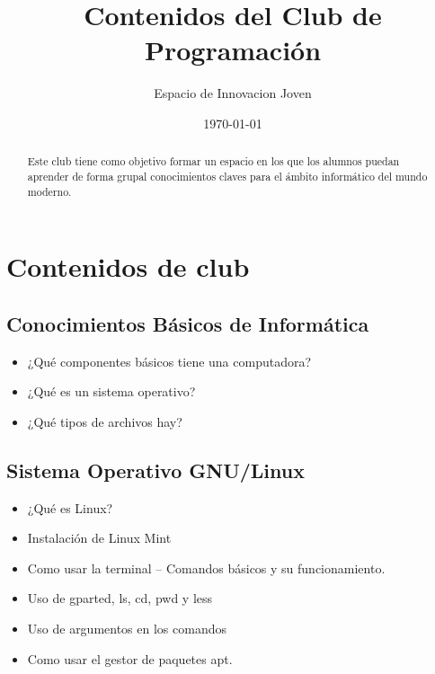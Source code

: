 \documentclass{article}
\title{Contenidos del Club de Programación}
\date{\today}
\author{Espacio de Innovacion Joven}
\begin{document}
\maketitle
\thispagestyle{fancy}

\begin{abstract}
	Este club tiene como objetivo formar un espacio en los que los alumnos
	puedan aprender de forma grupal conocimientos claves para el ámbito informático
	del mundo moderno.
\end{abstract}

\section{Contenidos de club}

\subsection{Conocimientos Básicos de Informática}
\begin{itemize}
	\item ¿Qué componentes básicos tiene una computadora?
	\item ¿Qué es un sistema operativo?
	\item ¿Qué tipos de archivos hay?
\end{itemize}

\subsection{Sistema Operativo GNU/Linux}
\begin{itemize}
	\item ¿Qué es Linux?
	\item Instalación de Linux Mint
	\item Como usar la terminal -- Comandos básicos y su funcionamiento.
	\item Uso de gparted, ls, cd, pwd y less
	\item Uso de argumentos en los comandos
	\item Como usar el gestor de paquetes apt.
\end{itemize}

\thispagestyle{fancy}
\end{document}
